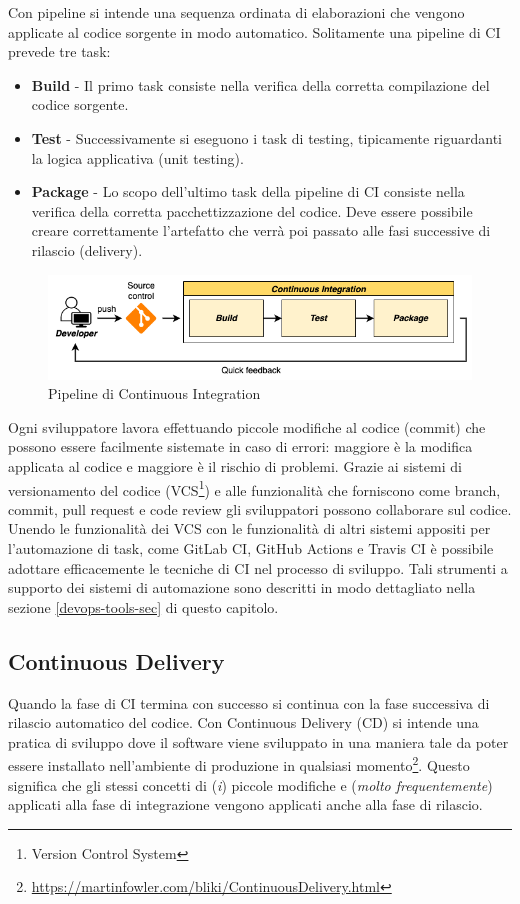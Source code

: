 Con pipeline si intende una sequenza ordinata di elaborazioni che vengono applicate al codice sorgente in modo automatico. Solitamente una pipeline di CI prevede tre task:

\begin{itemize}
    \item \textbf{Build} - Il primo task consiste nella verifica della corretta compilazione del codice sorgente.
    \item \textbf{Test} - Successivamente si eseguono i task di testing, tipicamente riguardanti la logica applicativa (unit testing).
    \item \textbf{Package} - Lo scopo dell'ultimo task della pipeline di CI consiste nella verifica della corretta pacchettizzazione del codice. Deve essere possibile creare correttamente l'artefatto che verrà poi passato alle fasi successive di rilascio (delivery).
\end{itemize}

\begin{figure}[H]
    \centering
    \includegraphics[width=1\textwidth]{img/ci-pipeline.png}
    \caption{Pipeline di Continuous Integration}
    \label{ci-pipeline}
\end{figure}

Ogni sviluppatore lavora effettuando piccole modifiche al codice (commit) che possono essere facilmente sistemate in caso di errori: maggiore è la modifica applicata al codice e maggiore è il rischio di problemi. Grazie ai sistemi di versionamento del codice (VCS\footnote{Version Control System}) e alle funzionalità che forniscono come branch, commit, pull request e code review gli sviluppatori possono collaborare sul codice. Unendo le funzionalità dei VCS con le funzionalità di altri sistemi appositi per l'automazione di task, come GitLab CI, GitHub Actions e Travis CI è possibile adottare efficacemente le tecniche di CI nel processo di sviluppo. Tali strumenti a supporto dei sistemi di automazione sono descritti in modo dettagliato nella sezione \ref{devops-tools-sec} di questo capitolo.

\subsection{Continuous Delivery}
\label{cd-sec}
Quando la fase di CI termina con successo si continua con la fase successiva di rilascio automatico del codice. Con Continuous Delivery (CD) si intende una pratica di sviluppo dove il software viene sviluppato in una maniera tale da poter essere installato nell'ambiente di produzione in qualsiasi momento\footnote{\href{https://martinfowler.com/bliki/ContinuousDelivery.html}{https://martinfowler.com/bliki/ContinuousDelivery.html}}. Questo significa che gli stessi concetti di (\textit{i}) piccole modifiche e (\textit{molto frequentemente}) applicati alla fase di integrazione vengono applicati anche alla fase di rilascio.

